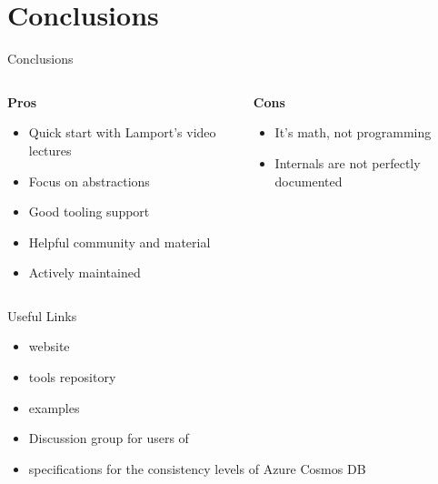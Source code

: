 \section*{Conclusions}
\begin{frame}{Conclusions}
    \begin{columns}[t]
        \begin{column}{0.5\textwidth}
            \textbf{Pros}
            \begin{itemize}
                \item Quick start with Lamport's video lectures %
                \item Focus on abstractions
                \item Good tooling support
                \item Helpful community and material
                \item Actively maintained
            \end{itemize}
        \end{column}
        \begin{column}{0.5\textwidth}
            \textbf{Cons}
            \begin{itemize}
                \item It's math, not programming
                \item Internals are not perfectly documented
            \end{itemize}
        \end{column}
        \end{columns}
\end{frame}

\begin{frame}{Useful Links}
    \begin{itemize}
        \item \tlap website\\
        \item \tlap tools repository\\
        \item \tlap examples\\
        \item Discussion group for users of \tlap\\
        \item \tlap specifications for the consistency levels of Azure Cosmos DB\\
    \end{itemize}
\end{frame}
